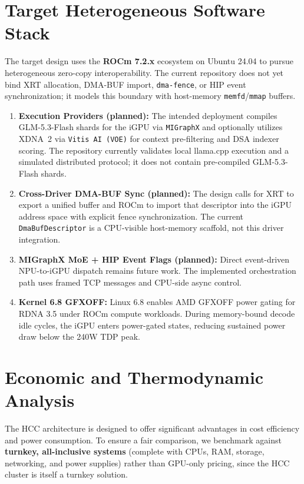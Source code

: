 \documentclass[11pt,a4paper]{article}
\begin{document}
\section{Target Heterogeneous Software Stack}

The target design uses the \textbf{ROCm 7.2.x} ecosystem on Ubuntu 24.04 to pursue heterogeneous zero-copy interoperability. The current repository does not yet bind XRT allocation, DMA-BUF import, \texttt{dma-fence}, or HIP event synchronization; it models this boundary with host-memory \texttt{memfd}/\texttt{mmap} buffers.

\begin{enumerate}
    \item \textbf{Execution Providers (planned):} The intended deployment compiles GLM-5.3-Flash shards for the iGPU via \texttt{MIGraphX} and optionally utilizes XDNA~2 via \texttt{Vitis AI (VOE)} for context pre-filtering and DSA indexer scoring. The repository currently validates local llama.cpp execution and a simulated distributed protocol; it does not contain pre-compiled GLM-5.3-Flash shards.
    \item \textbf{Cross-Driver DMA-BUF Sync (planned):} The design calls for XRT to export a unified buffer and ROCm to import that descriptor into the iGPU address space with explicit fence synchronization. The current \texttt{DmaBufDescriptor} is a CPU-visible host-memory scaffold, not this driver integration.
    \item \textbf{MIGraphX MoE + HIP Event Flags (planned):} Direct event-driven NPU-to-iGPU dispatch remains future work. The implemented orchestration path uses framed TCP messages and CPU-side async control.
    \item \textbf{Kernel 6.8 GFXOFF:} Linux 6.8 enables AMD GFXOFF power gating for RDNA 3.5 under ROCm compute workloads. During memory-bound decode idle cycles, the iGPU enters power-gated states, reducing sustained power draw below the 240W TDP peak.
\end{enumerate}

\section{Economic and Thermodynamic Analysis}

The HCC architecture is designed to offer significant advantages in cost efficiency and power consumption. To ensure a fair comparison, we benchmark against \textbf{turnkey, all-inclusive systems} (complete with CPUs, RAM, storage, networking, and power supplies) rather than GPU-only pricing, since the HCC cluster is itself a turnkey solution.
\end{document}

